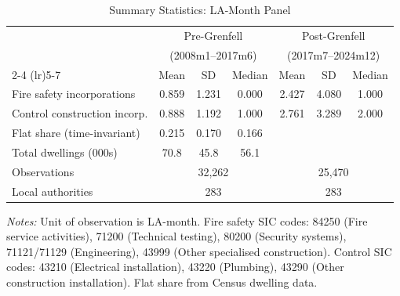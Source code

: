 \begin{table}[htbp]
\centering
\caption{Summary Statistics: LA-Month Panel}
\label{tab:summary}
\begin{tabular}{lcccccc}
\hline\hline
 & \multicolumn{3}{c}{Pre-Grenfell} & \multicolumn{3}{c}{Post-Grenfell} \\
 & \multicolumn{3}{c}{(2008m1--2017m6)} & \multicolumn{3}{c}{(2017m7--2024m12)} \\
\cmidrule(lr){2-4} \cmidrule(lr){5-7}
 & Mean & SD & Median & Mean & SD & Median \\
\hline
Fire safety incorporations & 0.859 & 1.231 & 0.000 & 2.427 & 4.080 & 1.000 \\
Control construction incorp. & 0.888 & 1.192 & 1.000 & 2.761 & 3.289 & 2.000 \\
Flat share (time-invariant) & 0.215 & 0.170 & 0.166 & & & \\
Total dwellings (000s) & 70.8 & 45.8 & 56.1 & & & \\
\hline
Observations & \multicolumn{3}{c}{32,262} & \multicolumn{3}{c}{25,470} \\
Local authorities & \multicolumn{3}{c}{283} & \multicolumn{3}{c}{283} \\
\hline\hline
\end{tabular}
\begin{tablenotes}[flushleft]
\small
\item \textit{Notes:} Unit of observation is LA-month. Fire safety SIC codes: 84250 (Fire service activities), 71200 (Technical testing), 80200 (Security systems), 71121/71129 (Engineering), 43999 (Other specialised construction). Control SIC codes: 43210 (Electrical installation), 43220 (Plumbing), 43290 (Other construction installation). Flat share from Census dwelling data.
\end{tablenotes}
\end{table}
